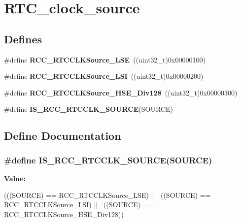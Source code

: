 \hypertarget{group__RTC__clock__source}{
\section{RTC\_\-clock\_\-source}
\label{group__RTC__clock__source}
}
\subsection*{Defines}
\begin{DoxyCompactItemize}
\item 
\hypertarget{group__RTC__clock__source_ga18c0c40ff4289148c9fa44c6848d5552}{
\#define {\bfseries RCC\_\-RTCCLKSource\_\-LSE}~((uint32\_\-t)0x00000100)}
\label{group__RTC__clock__source_ga18c0c40ff4289148c9fa44c6848d5552}

\item 
\hypertarget{group__RTC__clock__source_ga7758c87e4584bfa76cb99c726b7162c3}{
\#define {\bfseries RCC\_\-RTCCLKSource\_\-LSI}~((uint32\_\-t)0x00000200)}
\label{group__RTC__clock__source_ga7758c87e4584bfa76cb99c726b7162c3}

\item 
\hypertarget{group__RTC__clock__source_gada0bedcd0afa5104ec0ef398d1ac2778}{
\#define {\bfseries RCC\_\-RTCCLKSource\_\-HSE\_\-Div128}~((uint32\_\-t)0x00000300)}
\label{group__RTC__clock__source_gada0bedcd0afa5104ec0ef398d1ac2778}

\item 
\#define {\bfseries IS\_\-RCC\_\-RTCCLK\_\-SOURCE}(SOURCE)
\end{DoxyCompactItemize}


\subsection{Define Documentation}
\hypertarget{group__RTC__clock__source_gae76a0340b02b5342e756fa0d2112ebf5}{
\subsubsection[{IS\_\-RCC\_\-RTCCLK\_\-SOURCE}]{\setlength{\rightskip}{0pt plus 5cm}\#define IS\_\-RCC\_\-RTCCLK\_\-SOURCE(SOURCE)}}
\label{group__RTC__clock__source_gae76a0340b02b5342e756fa0d2112ebf5}
{\bfseries Value:}
\begin{DoxyCode}
(((SOURCE) == RCC_RTCCLKSource_LSE) || \
                                      ((SOURCE) == RCC_RTCCLKSource_LSI) || \
                                      ((SOURCE) == RCC_RTCCLKSource_HSE_Div128))
\end{DoxyCode}
